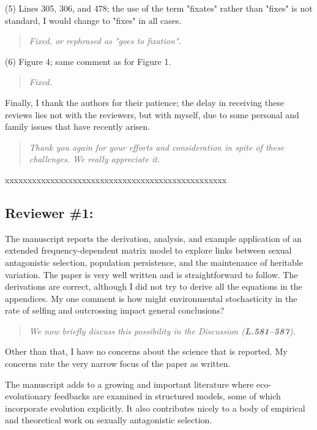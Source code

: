 \documentclass[11pt]{article}
\begin{document}
\noindent (5) Lines 305, 306, and 478; the use of the term "fixates" rather than "fixes" is not standard, I would change to "fixes" in all cases.
\begin{quote}
	{\itshape Fixed, or rephrased as "goes to fixation".}
\end{quote}

\noindent (6) Figure 4; same comment as for Figure 1.
\begin{quote}
	{\itshape Fixed.}
\end{quote}

Finally, I thank the authors for their patience; the delay in receiving these reviews lies not with the reviewers, but with myself, due to some personal and family issues that have recently arisen.

\begin{quote}
	{\itshape Thank you again for your efforts and consideration in spite of these challenges. We really appreciate it.}
\end{quote}


\noindent xxxxxxxxxxxxxxxxxxxxxxxxxxxxxxxxxxxxxxxxxxxxxxxxx

\subsection*{Reviewer \#1:}

The manuscript reports the derivation, analysis, and example application of an extended frequency-dependent matrix model to explore links between sexual antagonistic selection, population persistence, and the maintenance of heritable variation. The paper is very well written and is straightforward to follow. The derivations are correct, although I did not try to derive all the equations in the appendices. My one comment is how might environmental stochasticity in the rate of selfing and outcrossing impact general conclusions? 
\begin{quote}
	{\itshape We now briefly discuss this possibility in the Discussion ({\bf L.581--587}).}
\end{quote}


Other than that, I have no concerns about the science that is reported. My concerns rate the very narrow focus of the paper as written.

The manuscript adds to a growing and important literature where eco-evolutionary feedbacks are examined in structured models, some of which incorporate evolution explicitly. It also contributes nicely to a body of empirical and theoretical work on sexually antagonistic selection.
\end{document}
